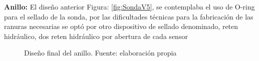 \begin{appendices}
\textbf{Anillo: }
El diseño anterior Figura: \ref{fig:SondaV5}, se contemplaba el uso de O-ring para el sellado de la sonda, por las dificultades t\'ecnicas para la fabricaci\'on de las ranuras necesarias se opt\'o por otro dispositivo de sellado denominado,  reten hidr\'aulico, dos reten hidr\'aulico por abertura de cada sensor
\\
\begin{figure}[ht]
\centering
{}
\caption{Dise\~no final del anillo. Fuente: elaboración propia}
\label{fig:Anillo2019}
\end{figure}


\end{appendices}
